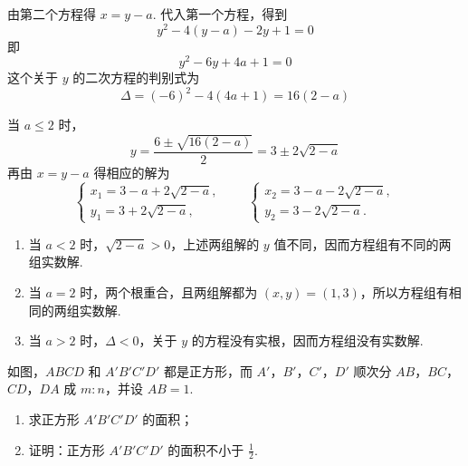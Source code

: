 \documentclass[UTF8,a4paper,oneside,11pt]{ctexbook}
\begin{document}
\begin{solution}
由第二个方程得 \(x=y-a\). 代入第一个方程，得到
\[
y^2-4\left(y-a\right)-2y+1=0
\]
即
\[
y^2-6y+4a+1=0
\]
这个关于 \(y\) 的二次方程的判别式为
\[
\Delta=(-6)^2-4\left(4a+1\right)=16\left(2-a\right)
\]

当 \(a\leq2\) 时，
\[
y=\frac{6\pm\sqrt{16\left(2-a\right)}}{2}=3\pm2\sqrt{2-a}
\]
再由 \(x=y-a\) 得相应的解为
\[
\begin{cases}
x_1=3-a+2\sqrt{2-a},\\
y_1=3+2\sqrt{2-a},
\end{cases}
\qquad
\begin{cases}
x_2=3-a-2\sqrt{2-a},\\
y_2=3-2\sqrt{2-a}.
\end{cases}
\]

\begin{enumerate}
\item 当 \(a<2\) 时，\(\sqrt{2-a}>0\)，上述两组解的 \(y\) 值不同，因而方程组有不同的两组实数解.

\item 当 \(a=2\) 时，两个根重合，且两组解都为 \((x,y)=(1,3)\)，所以方程组有相同的两组实数解.

\item 当 \(a>2\) 时，\(\Delta<0\)，关于 \(y\) 的方程没有实根，因而方程组没有实数解.
\end{enumerate}
\end{solution}

\begin{problem}
如图，\(ABCD\) 和 \(A'B'C'D'\) 都是正方形，而 \(A'\)，\(B'\)，\(C'\)，\(D'\) 顺次分 \(AB\)，\(BC\)，\(CD\)，\(DA\) 成 \(m:n\)，并设 \(AB=1\).

\begin{enumerate}
\item 求正方形 \(A'B'C'D'\) 的面积；
\item 证明：正方形 \(A'B'C'D'\) 的面积不小于 \(\frac12\).
\end{enumerate}

\end{problem}
\end{document}
